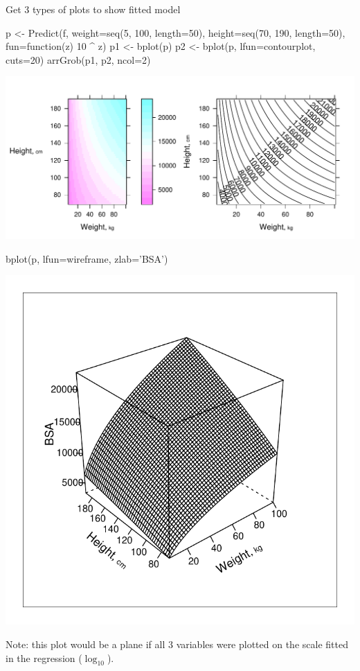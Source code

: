 Get 3 types of plots to show fitted model\ipacue
\begin{Schunk}
\begin{Sinput}
p <- Predict(f, weight=seq(5, 100, length=50),
             height=seq(70, 190, length=50), fun=function(z) 10 ^ z)
p1 <- bplot(p)
p2 <- bplot(p, lfun=contourplot, cuts=20)
arrGrob(p1, p2, ncol=2)
\end{Sinput}


\centerline{\includegraphics{reg-dreg3-1} }

\end{Schunk}
\begin{Schunk}
\begin{Sinput}
bplot(p, lfun=wireframe, zlab='BSA')
\end{Sinput}


\centerline{\includegraphics{reg-dreg4-1} }

\end{Schunk}
Note: this plot would be a plane if all 3 variables were plotted on
the scale fitted in the regression ($\log_{10}$).

